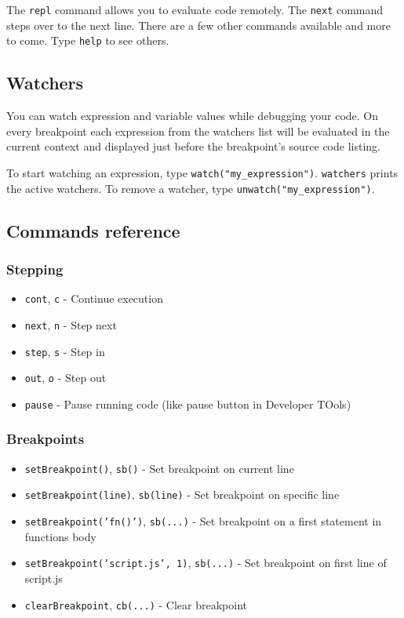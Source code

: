 The \texttt{repl} command allows you to evaluate code remotely. The
\texttt{next} command steps over to the next line. There are a few other
commands available and more to come. Type \texttt{help} to see others.

\subsection{Watchers}

You can watch expression and variable values while debugging your code.
On every breakpoint each expression from the watchers list will be
evaluated in the current context and displayed just before the
breakpoint's source code listing.

To start watching an expression, type \texttt{watch("my\_expression")}.
\texttt{watchers} prints the active watchers. To remove a watcher, type
\texttt{unwatch("my\_expression")}.

\subsection{Commands reference}

\subsubsection{Stepping}

\begin{itemize}
\item
  \texttt{cont}, \texttt{c} - Continue execution
\item
  \texttt{next}, \texttt{n} - Step next
\item
  \texttt{step}, \texttt{s} - Step in
\item
  \texttt{out}, \texttt{o} - Step out
\item
  \texttt{pause} - Pause running code (like pause button in Developer
  TOols)
\end{itemize}

\subsubsection{Breakpoints}

\begin{itemize}
\item
  \texttt{setBreakpoint()}, \texttt{sb()} - Set breakpoint on current
  line
\item
  \texttt{setBreakpoint(line)}, \texttt{sb(line)} - Set breakpoint on
  specific line
\item
  \texttt{setBreakpoint('fn()')}, \texttt{sb(...)} - Set breakpoint on a
  first statement in functions body
\item
  \texttt{setBreakpoint('script.js', 1)}, \texttt{sb(...)} - Set
  breakpoint on first line of script.js
\item
  \texttt{clearBreakpoint}, \texttt{cb(...)} - Clear breakpoint
\end{itemize}

